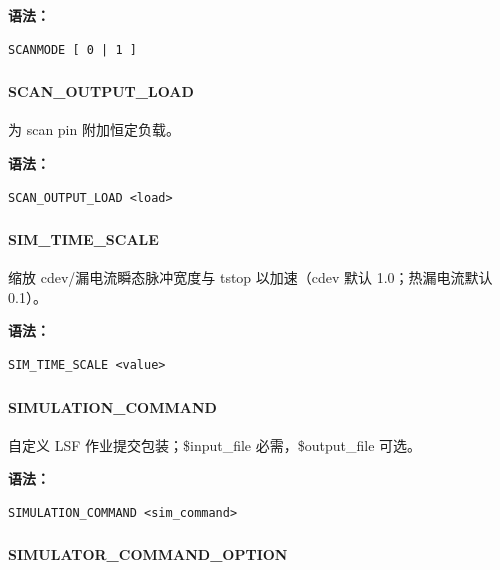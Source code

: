 \textbf{语法：}
\begin{lstlisting}
SCANMODE [ 0 | 1 ]
\end{lstlisting}

\subsubsection{}
\paragraph*{SCAN_OUTPUT_LOAD}

为 scan pin 附加恒定负载。

\textbf{语法：}
\begin{lstlisting}
SCAN_OUTPUT_LOAD <load>
\end{lstlisting}

\subsubsection{}
\paragraph*{SIM_TIME_SCALE}

缩放 cdev/漏电流瞬态脉冲宽度与 tstop 以加速（cdev 默认 1.0；热漏电流默认 0.1）。

\textbf{语法：}
\begin{lstlisting}
SIM_TIME_SCALE <value>
\end{lstlisting}

\subsubsection{}
\paragraph*{SIMULATION_COMMAND}

自定义 LSF 作业提交包装；\$input\_file 必需，\$output\_file 可选。

\textbf{语法：}
\begin{lstlisting}
SIMULATION_COMMAND <sim_command>
\end{lstlisting}

\subsubsection{}
\paragraph*{SIMULATOR_COMMAND_OPTION}

